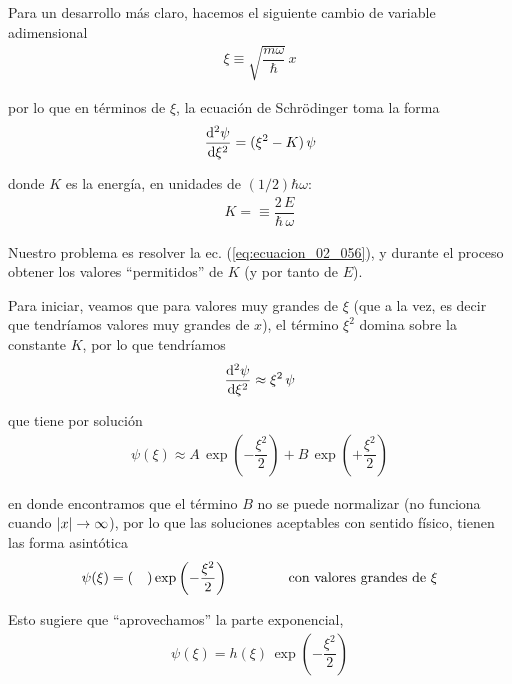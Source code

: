 Para un desarrollo más claro, hacemos el siguiente cambio de variable adimensional
\begin{align}
\xi \equiv \sqrt{ \dfrac{m \omega}{\hbar}} \, x
\label{eq:ecuacion_02_055}
\end{align}

por lo que en términos de $\xi$, la ecuación de Schrödinger toma la forma
\begin{align}
\dv[2]{\psi}{\xi} = (\xi^{2} - K) \, \psi
\label{eq:ecuacion_02_056}
\end{align}

donde $K$ es la energía, en unidades de $(1/2) \hbar \omega$:
\begin{align}
K = \equiv \dfrac{2 \, E}{\hbar \, \omega}
\label{eq:ecuacion_02_057}
\end{align}

Nuestro problema es resolver la ec. (\ref{eq:ecuacion_02_056}), y durante el proceso obtener los valores \enquote{permitidos} de $K$ (y por tanto de $E$).
\par
Para iniciar, veamos que para valores muy grandes de $\xi$ (que a la vez, es decir que tendríamos valores muy grandes de $x$), el término $\xi^{2}$ domina sobre la constante $K$, por lo que tendríamos
\begin{align}
\dv[2]{\psi}{\xi} \approx \xi^{2} \, \psi
\label{eq:ecuacion_02_058}
\end{align}

que tiene por solución
\begin{align}
\psi (\xi) \approx A \, \exp \left( - \dfrac{\xi^{2}}{2} \right) + B \, \exp \left( + \dfrac{\xi^{2}}{2} \right)
\label{eq:ecuacion_02_059}
\end{align}

en donde encontramos que el término $B$ no se puede normalizar (no funciona cuando $\abs{x} \to \infty$), por lo que las soluciones aceptables con sentido físico, tienen las forma asintótica
\begin{align}
\psi (\xi) = ( \quad ) \exp \left( - \dfrac{\xi^{2}}{2} \right) \hspace{1.5cm} \text{con valores grandes de } \xi
\label{eq:ecuacion_02_060}
\end{align}

Esto sugiere que \enquote{aprovechamos} la parte exponencial,
\begin{align}
\psi (\xi) = h (\xi) \, \exp \left( - \dfrac{\xi^{2}}{2} \right)
\label{eq:ecuacion_02_061}
\end{align}

